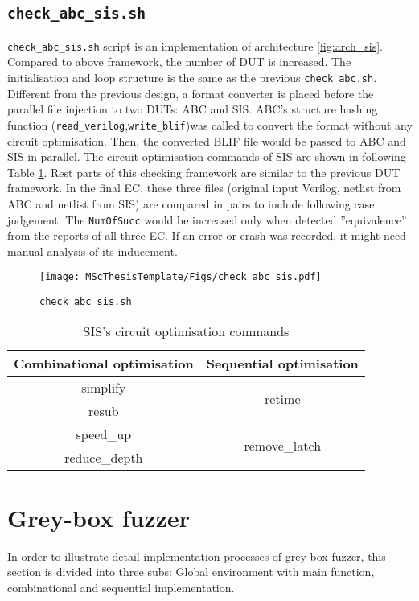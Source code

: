 \subsection{\texttt{check\_abc\_sis.sh}}
\texttt{check\_abc\_sis.sh} script is an implementation of architecture \ref{fig:arch_sis}. Compared to above framework, the number of DUT is increased. The initialisation and loop structure is the same as the previous \texttt{check\_abc.sh}. Different from the previous design, a format converter is placed before the parallel file injection to two DUTs: ABC and SIS. ABC's structure hashing function (\texttt{read\_verilog},\texttt{write\_blif})was called to convert the format without any circuit optimisation. Then, the converted BLIF file would be passed to ABC and SIS in parallel. The circuit optimisation commands of SIS are shown in following Table \ref{tab:sis commands}. Rest parts of this checking framework are similar to the previous DUT framework. In the final EC, these three files (original input Verilog, netlist from ABC and netlist from SIS) are compared in pairs to include following case judgement. The \texttt{NumOfSucc} would be increased only when detected ''equivalence'' from the reports of all three EC. If an error or crash was recorded, it might need manual analysis of its inducement.  
\begin{figure}[htb]
    \centering
    \texttt{[image: MScThesisTemplate/Figs/check\_abc\_sis.pdf]}
    \caption{\footnotesize\texttt{check\_abc\_sis.sh}}
    \label{fig:check_sis}
\end{figure}

\begin{table}[htb]
    \centering
    \begin{tabular}{c|c}
    \hline
         Combinational optimisation&Sequential optimisation  \\
         \hline
         simplify & \multirow{2}{*}{retime}\\
         resub&\\
         speed\_up& \multirow{2}{*}{remove\_latch}\\
         reduce\_depth&\\
    \end{tabular}
    \caption{\footnotesize SIS's circuit optimisation commands}
    \label{tab:sis commands}
\end{table}
\section{Grey-box fuzzer}
In order to illustrate detail implementation processes of grey-box fuzzer, this section is divided into three subs: Global environment with main function, combinational and sequential implementation.
